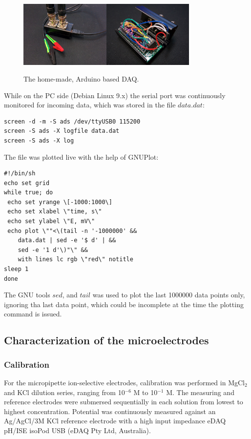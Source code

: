 \begin{figure}
\centering
\includegraphics[width=0.4\textwidth]{img/daq1.jpg}\includegraphics[width=0.4\textwidth]{img/daq2.jpg}
\caption[The home-made, Arduino based DAQ.]{The home-made, Arduino based DAQ.}
\label{fig:daq}
\end{figure}

While on the PC side (Debian Linux 9.x) the serial port was continuously monitored for incoming data, which was stored in the file $data.dat$:

\begin{lstlisting}
screen -d -m -S ads /dev/ttyUSB0 115200
screen -S ads -X logfile data.dat
screen -S ads -X log
\end{lstlisting}

The file was plotted live with the help of GNUPlot:

\begin{lstlisting}
#!/bin/sh
echo set grid
while true; do
 echo set yrange \[-1000:1000\]
 echo set xlabel \"time, s\"
 echo set ylabel \"E, mV\"
 echo plot \""<\(tail -n '-1000000' &&
	data.dat | sed -e '$ d' | &&
	sed -e '1 d'\)"\" &&
	with lines lc rgb \"red\" notitle
sleep 1
done
\end{lstlisting}

The GNU tools $sed$, and $tail$ was used to plot the last 1000000 data points only, ignoring tha last data point, which could be incomplete at the time the plotting command is issued.

 		\subsection{Characterization of the microelectrodes}
			\subsubsection{Calibration}
For the micropipette ion-selective electrodes, calibration was performed in MgCl$_2$ and KCl dilution series, ranging from 10$^{-6}$ M to 10$^{-1}$ M.
The measuring and reference electrodes were submersed sequentially in each solution from lowest to highest concentration.
Potential was continuously measured against an Ag/AgCl/3M KCl reference electrode with a high input impedance eDAQ pH/ISE isoPod USB (eDAQ Pty Ltd, Australia).

